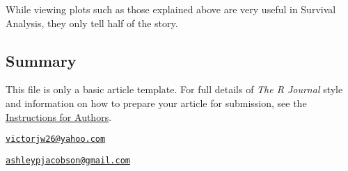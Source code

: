 While viewing plots such as those explained above are very useful in
Survival Analysis, they only tell half of the story.

\hypertarget{summary}{%
\subsection{Summary}\label{summary}}

This file is only a basic article template. For full details of
\emph{The R Journal} style and information on how to prepare your
article for submission, see the
\href{https://journal.r-project.org/share/author-guide.pdf}{Instructions
for Authors}.




\address{%
Victor Wilson\\
California Polytechnic State University, San Luis Obispo - Statistics
Department\\
\\
}
\href{mailto:victorjw26@yahoo.com}{\nolinkurl{victorjw26@yahoo.com}}

\address{%
Ashley Jacobson\\
California Polytechnic State University, San Luis Obispo - Statistics
Department\\
\\
}
\href{mailto:ashleypjacobson@gmail.com}{\nolinkurl{ashleypjacobson@gmail.com}}

